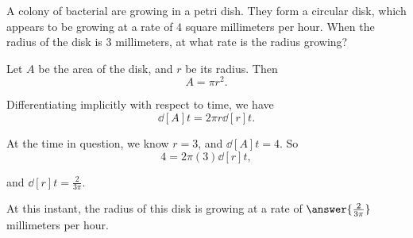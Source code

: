 \documentclass{ximera}
\author{Steven Gubkin}
\begin{document}
\begin{exercise}



A colony of bacterial are growing in a petri dish.  They form a
circular disk, which appears to be growing at a rate of $4$ square
millimeters per hour.  When the radius of the disk is $3$ millimeters,
at what rate is the radius growing?

\begin{hint}
  Let $A$ be the area of the disk, and $r$ be its radius.  Then
  \[
  A = \pi r^2.
  \]
\end{hint}

\begin{hint}
  Differentiating implicitly with respect to time, we have
  \[
  \dd[A]{t} = 2\pi r \dd[r]{t}.
  \]
\end{hint}

\begin{hint}
  At the time in question, we know $r = 3$, and $\dd[A]{t} = 4$.
  So
  \[
  4 = 2 \pi (3) \dd[r]{t},
  \]

and $\dd[r]{t} = \frac{2}{3\pi}$.
\end{hint}

\begin{prompt}
  At this instant, the radius of this disk is growing at a rate
  of $\answer{\frac{2}{3\pi}}$ millimeters per hour.
\end{prompt}

\end{exercise}
\end{document}
